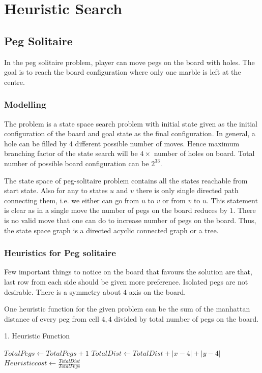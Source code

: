 \documentclass[journal, compsoc]{IEEEtran}
\begin{document}
\section{Heuristic Search}
\subsection{Peg Solitaire}
In the peg solitaire problem, player can move pegs on the board with holes. The goal is to reach the board configuration where only one marble is left at the centre. 

\subsubsection{Modelling}
The problem is a state space search problem with initial state given as the initial configuration of the board and goal state as the final configuration.
In general, a hole can be filled by 4 different possible number of moves. Hence maximum branching factor of the state search will be $4 \times$  number of holes on board. Total number of possible board configuration can be $2^{33}$. 

The state space of peg-solitaire problem contains all the states reachable from start state. Also for any to states $u$ and $v$ there is only single directed path connecting them, i.e. we either can go from $u$ to $v$ or from $v$ to $u$. This statement is clear as in a single move the number of pegs on the board reduces by $1$. There is no valid move that one can do to increase number of pegs on the board. Thus, the state space graph is a directed acyclic connected graph or a tree.

\subsubsection{Heuristics for Peg solitaire}
Few important things to notice on the board that favours the solution are that, last row from each side should be given more preference. Isolated pegs are not desirable. There is a symmetry about $4$ axis on the board.

One heuristic function for the given problem can be the sum of the manhattan distance of every peg from cell $4,4$ divided by total number of pegs on the board.
\begin{algorithm}
\caption{1. Heuristic Function}
\begin{algorithmic}[1]
\State $TotalPegs \gets TotalPegs+1$
\State $TotalDist \gets TotalDist+ |x-4|+|y-4|$
\EndWhile
\State $Heuristic cost \gets \frac{TotalDist}{TotalPegs}$
\EndProcedure
\end{algorithmic}
\end{algorithm}
\end{document}
